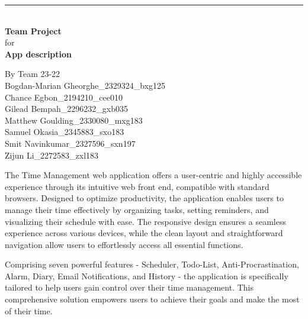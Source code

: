 \documentclass[a4paper]{article}
\begin{document}

\begin{titlepage}
	
	\rule{\linewidth}{5pt}
	\raggedleft
	\fontsize{38pt}{50pt}\selectfont
    \textbf{\\Team Project\\}
    \fontsize{28pt}{60pt}\selectfont 
    for\\
    \fontsize{38pt}{60pt}\selectfont 
    \textbf{App description\\}
	
	\vfill %
	
	
	\parbox[t]{0.93\textwidth}{ %
		\raggedleft %
		\large %
		{\Large By Team 23-22}\\[4pt] %
		Bogdan-Marian Gheorghe\_2329324\_bxg125\\
		Chance Egbon\_2194210\_cee010\\
		Gilead Bempah\_2296232\_gxb035\\
		Matthew Goulding\_2330080\_mxg183\\
		Samuel Okasia\_2345883\_sxo183\\
		Smit Navinkumar\_2327596\_sxn197\\
		Zijun Li\_2272583\_zxl183\\
	}
	
\end{titlepage}

The Time Management web application offers a user-centric and highly accessible experience through its intuitive web front end, compatible with standard browsers. Designed to optimize productivity, the application enables users to manage their time effectively by organizing tasks, setting reminders, and visualizing their schedule with ease. The responsive design ensures a seamless experience across various devices, while the clean layout and straightforward navigation allow users to effortlessly access all essential functions.

Comprising seven powerful features - Scheduler, Todo-List, Anti-Procrastination, Alarm, Diary, Email Notifications, and History - the application is specifically tailored to help users gain control over their time management. This comprehensive solution empowers users to achieve their goals and make the most of their time.
\end{document}
